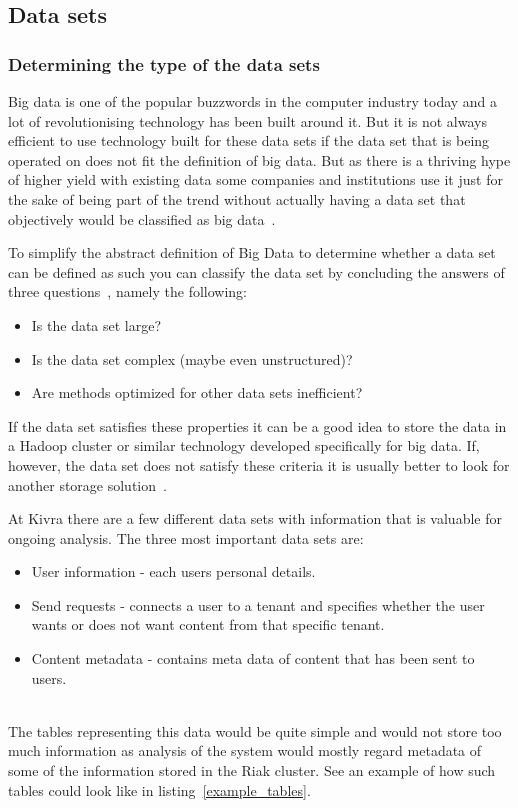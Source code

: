 \documentclass[a4paper,12pt]{article}
\begin{document}
\subsection{Data sets}
\subsubsection{Determining the type of the data sets}
Big data is one of the popular buzzwords in the computer industry today and a lot of revolutionising technology has been built around it. But it is not always efficient to use technology built for 
these data sets if the data set that is being operated on does not fit the definition of big data. But as there is a thriving hype of higher yield with existing data some companies and institutions use it 
just for the sake of being part of the trend without actually having a data set that objectively would be classified as big data~\cite{NOTBIG}.


To simplify the abstract definition of Big Data to determine whether a data set can be defined as such you can classify the data set by concluding the answers of 
three questions~\cite{BD1}, namely the following:
\begin{itemize}
    \item Is the data set large?
    \item Is the data set complex (maybe even unstructured)?
    \item Are methods optimized for other data sets inefficient?
\end{itemize}

If the data set satisfies these properties it can be a good idea to store the data in a Hadoop cluster or similar technology developed specifically for big data. 
If, however, the data set does not satisfy these criteria it is usually better to look for another storage solution~\cite{NOTBIG}.

At Kivra there are a few different data sets with information that is valuable for ongoing analysis. 
The three most important data sets are: 
\begin{itemize}
    \item User information - each users personal details.
    \item Send requests - connects a user to a tenant and specifies whether the user wants or does not want content from that specific tenant.
    \item Content metadata - contains meta data of content that has been sent to users. 
\end{itemize}
~\\
The tables representing this data would be quite simple and would not store too much information as analysis of the system would mostly regard metadata of some of the information stored in the Riak cluster.
See an example of how such tables could look like in listing~\ref{example_tables}.
\end{document}
